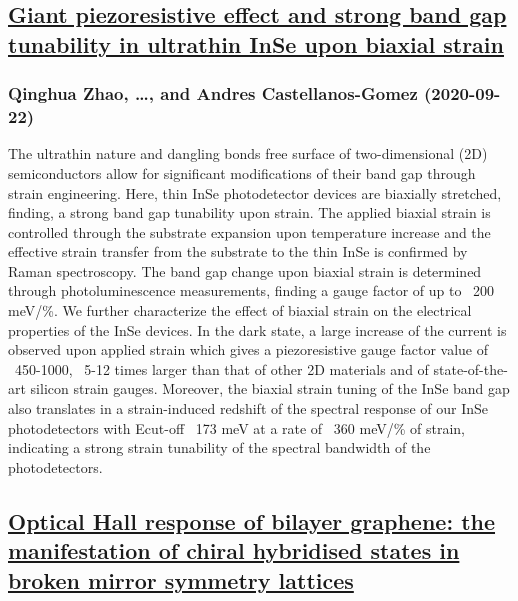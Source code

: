 {\subsection*{\href{http://arxiv.org/abs/2009.10402v1}{Giant piezoresistive effect and strong band gap tunability in ultrathin  InSe upon biaxial strain}}
\subsubsection*{Qinghua Zhao, \dots, and Andres Castellanos-Gomez (2020-09-22)}
The ultrathin nature and dangling bonds free surface of two-dimensional (2D)
semiconductors allow for significant modifications of their band gap through
strain engineering. Here, thin InSe photodetector devices are biaxially
stretched, finding, a strong band gap tunability upon strain. The applied
biaxial strain is controlled through the substrate expansion upon temperature
increase and the effective strain transfer from the substrate to the thin InSe
is confirmed by Raman spectroscopy. The band gap change upon biaxial strain is
determined through photoluminescence measurements, finding a gauge factor of up
to ~200 meV/\%. We further characterize the effect of biaxial strain on the
electrical properties of the InSe devices. In the dark state, a large increase
of the current is observed upon applied strain which gives a piezoresistive
gauge factor value of ~450-1000, ~5-12 times larger than that of other 2D
materials and of state-of-the-art silicon strain gauges. Moreover, the biaxial
strain tuning of the InSe band gap also translates in a strain-induced redshift
of the spectral response of our InSe photodetectors with {\Delta}Ecut-off ~173
meV at a rate of ~360 meV/\% of strain, indicating a strong strain tunability of
the spectral bandwidth of the photodetectors.

\subsection*{\href{http://arxiv.org/abs/2009.10398v1}{Optical Hall response of bilayer graphene: the manifestation of chiral  hybridised states in broken mirror symmetry lattices}}
}
